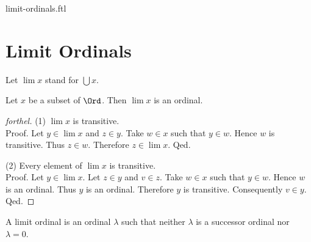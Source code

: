 \documentclass{naproche-library}
\begin{document}
\begin{smodule}{limit-ordinals.ftl}

  \section*{Limit Ordinals}

  \begin{forthel}
    Let $\lim x$ stand for $\bigcup x$.
  \end{forthel}

  \begin{proposition}[forthel,id=SET_THEORY_02_7202164443185152,printid]
    Let $x$ be a subset of $\Ord$.
    Then $\lim x$ is an ordinal.
  \end{proposition}
  \begin{proof}[forthel]
    (1) $\lim x$ is transitive. \\
    Proof.
      Let $y \in \lim x$ and $z \in y$.
      Take $w \in x$ such that $y \in w$.
      Hence $w$ is transitive.
      Thus $z \in w$.
      Therefore $z \in \lim x$.
    Qed.

    (2) Every element of $\lim x$ is transitive. \\
    Proof.
      Let $y \in \lim x$.
      Let $z \in y$ and $v \in z$.
      Take $w \in x$ such that $y \in w$.
      Hence $w$ is an ordinal.
      Thus $y$ is an ordinal.
      Therefore $y$ is transitive.
      Consequently $v \in y$.
    Qed.
  \end{proof}

  \begin{definition}[forthel,id=SET_THEORY_02_7678388934279168,printid]
    A limit ordinal is an ordinal $\lambda$ such that neither $\lambda$ is a successor ordinal nor $\lambda = 0$.
  \end{definition}
\end{smodule}
\end{document}
